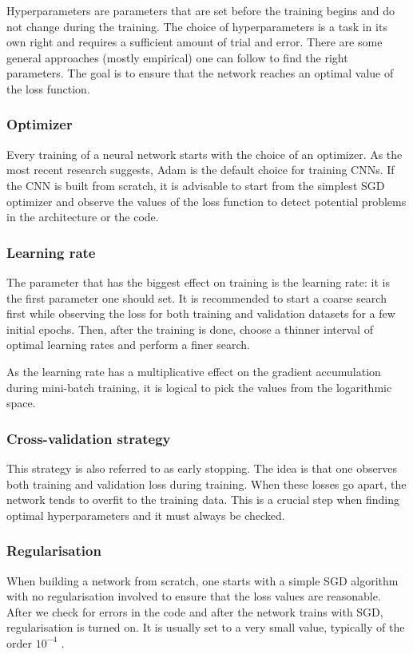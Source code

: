 Hyperparameters are parameters that are set before the training begins and do not change during the training. The choice of hyperparameters is a task in its own right and requires a sufficient amount of trial and error. There are some general approaches (mostly empirical) one can follow to find the right parameters. The goal is to ensure that the network reaches an optimal value of the loss function. \cite{stanford-github}

\subsubsection{Optimizer}

Every training of a neural network starts with the choice of an optimizer. As the most recent research suggests, Adam is the default choice for training CNNs. If the CNN is built from scratch, it is advisable to start from the simplest SGD optimizer and observe the values of the loss function to detect potential problems in the architecture or the code. \cite{stanford-L7}

\subsubsection{Learning rate}

The parameter that has the biggest effect on training is the learning rate: it is the first parameter one should set. It is recommended to start a coarse search first while observing the loss for both training and validation datasets for a few initial epochs. Then, after the training is done, choose a thinner interval of optimal learning rates and perform a finer search. \cite{stanford-L6}

As the learning rate has a multiplicative effect on the gradient accumulation during mini-batch training, it is logical to pick the values from the logarithmic space. \cite{stanford-L6}

\subsubsection{Cross-validation strategy}

This strategy is also referred to as early stopping. The idea is that one observes both training and validation loss during training. When these losses go apart, the network tends to overfit to the training data. This is a crucial step when finding optimal hyperparameters and it must always be checked. \cite{stanford-github}

\subsubsection{Regularisation}

When building a network from scratch, one starts with a simple SGD algorithm with no regularisation involved to ensure that the loss values are reasonable. After we check for errors in the code and after the network trains with SGD, regularisation is turned on. It is usually set to a very small value, typically of the order $ 10^{-4} $ \cite{stanford-L6}.



